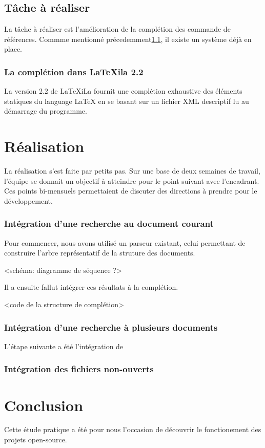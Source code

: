 \documentclass[a4paper,11pt]{report}
\begin{document}
\section{Tâche à réaliser} %
\label{sec:tache_a_realiser}
La tâche à réaliser est l'amélioration de la complétion des commande de références. Commme mentionné précedemment\ref{sub:completion}, il existe un système déjà en place.


\subsection{La complétion dans LaTeXila 2.2}
\label{sub:completion}
La version 2.2 de LaTeXiLa fournit une complétion exhaustive des éléments statiques du language LaTeX en se basant sur un fichier XML descriptif lu au démarrage du programme. 



\chapter{Réalisation}
La réalisation s'est faite par petits pas. Sur une base de deux semaines de travail, l'équipe se donnait un objectif à atteindre pour le point suivant avec l'encadrant.
Ces points bi-mensuels permettaient de discuter des directions à prendre pour le développement.

\subsection{Intégration d'une recherche au document courant}
Pour commencer, nous avons utilisé un parseur existant, celui permettant de construire l'arbre représentatif de la struture des documents.

<schéma: diagramme de séquence ?>

Il a ensuite fallut intégrer ces résultats à la complétion.

<code de la structure de complétion> 

\subsection{Intégration d'une recherche à plusieurs documents}

L'étape suivante a été l'intégration de 

\subsection{Intégration des fichiers non-ouverts}

\chapter{Conclusion}
Cette étude pratique a été pour nous l'occasion de découvrir le fonctionement des projets open-source.
\end{document}
